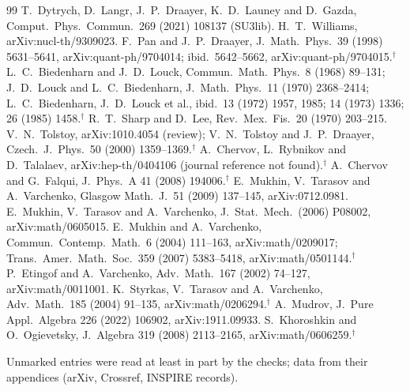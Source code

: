 \documentclass[11pt]{article}
\begin{document}
{\begin{thebibliography}{99}
 T.~Dytrych, D.~Langr, J.~P.~Draayer, K.~D.~Launey and D.~Gazda, Comput.\ Phys.\ Commun.\ 269 (2021) 108137 (SU3lib).
 H.~T.~Williams, arXiv:nucl-th/9309023.
 F.~Pan and J.~P.~Draayer, J.~Math.\ Phys.\ 39 (1998) 5631--5641, arXiv:quant-ph/9704014; ibid.\ 5642--5662, arXiv:quant-ph/9704015.$^\dagger$
 L.~C.~Biedenharn and J.~D.~Louck, Commun.\ Math.\ Phys.\ 8 (1968) 89--131; J.~D.~Louck and L.~C.~Biedenharn, J.~Math.\ Phys.\ 11 (1970) 2368--2414; L.~C.~Biedenharn, J.~D.~Louck et al., ibid.\ 13 (1972) 1957, 1985; 14 (1973) 1336; 26 (1985) 1458.$^\dagger$
 R.~T.~Sharp and D.~Lee, Rev.\ Mex.\ Fis.\ 20 (1970) 203--215.
 V.~N.~Tolstoy, arXiv:1010.4054 (review); V.~N.~Tolstoy and J.~P.~Draayer, Czech.\ J.~Phys.\ 50 (2000) 1359--1369.$^\dagger$
 A.~Chervov, L.~Rybnikov and D.~Talalaev, arXiv:hep-th/0404106 (journal reference not found).$^\dagger$
 A.~Chervov and G.~Falqui, J.~Phys.\ A 41 (2008) 194006.$^\dagger$
 E.~Mukhin, V.~Tarasov and A.~Varchenko, Glasgow Math.\ J.\ 51 (2009) 137--145, arXiv:0712.0981.
 E.~Mukhin, V.~Tarasov and A.~Varchenko, J.~Stat.\ Mech.\ (2006) P08002, arXiv:math/0605015.
 E.~Mukhin and A.~Varchenko, Commun.\ Contemp.\ Math.\ 6 (2004) 111--163, arXiv:math/0209017; Trans.\ Amer.\ Math.\ Soc.\ 359 (2007) 5383--5418, arXiv:math/0501144.$^\dagger$
 P.~Etingof and A.~Varchenko, Adv.\ Math.\ 167 (2002) 74--127, arXiv:math/0011001.
 K.~Styrkas, V.~Tarasov and A.~Varchenko, Adv.\ Math.\ 185 (2004) 91--135, arXiv:math/0206294.$^\dagger$
 A.~Mudrov, J.~Pure Appl.\ Algebra 226 (2022) 106902, arXiv:1911.09933.
 S.~Khoroshkin and O.~Ogievetsky, J.~Algebra 319 (2008) 2113--2165, arXiv:math/0606259.$^\dagger$
\end{thebibliography}

Unmarked entries were read at least in part by the checks; data from their appendices (arXiv, Crossref, INSPIRE records).\par}
\end{document}
